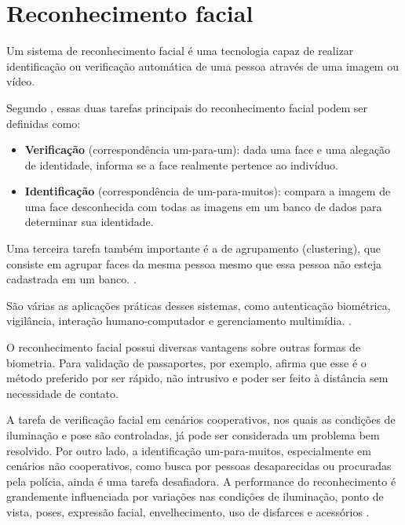\chapter{Reconhecimento facial}\label{cap:reconhecimento_facial}

Um sistema de reconhecimento facial é uma tecnologia capaz de realizar identificação ou verificação automática de uma pessoa através de uma imagem ou vídeo. 

Segundo , essas duas tarefas principais do reconhecimento facial podem ser definidas como:
%
\begin{itemize}
\item \textbf{Verificação} (correspondência um-para-um): dada uma face e uma alegação de identidade, informa se a face realmente pertence ao indivíduo.  

\item \textbf{Identificação} (correspondência de um-para-muitos): compara a imagem de uma face desconhecida com todas as imagens em um banco de dados para determinar sua identidade.
\end{itemize}

Uma terceira tarefa também importante é a de agrupamento (clustering), que consiste em agrupar faces da mesma pessoa mesmo que essa pessoa não esteja cadastrada em um banco. \cite{dhingra2017face, schroff2015facenet}.

São várias as aplicações práticas desses sistemas, como autenticação biométrica, vigilância, interação humano-computador e gerenciamento multimídia. \cite{jain2011handbook}.

O reconhecimento facial possui diversas vantagens sobre outras formas de biometria. Para validação de passaportes, por exemplo,  afirma que esse é o método preferido por ser rápido, não intrusivo e poder ser feito à distância sem necessidade de contato.

A tarefa de verificação facial em cenários cooperativos, nos quais as condições de iluminação e pose são controladas, já pode ser considerada um problema bem resolvido. Por outro lado, a identificação um-para-muitos, especialmente em cenários não cooperativos, como busca por pessoas desaparecidas ou procuradas pela polícia, ainda é uma tarefa desafiadora.
A performance do reconhecimento é grandemente influenciada por variações nas condições de iluminação, ponto de vista, poses, expressão facial, envelhecimento, uso de disfarces e acessórios \cite{li2016kernel, jain2011handbook}.

